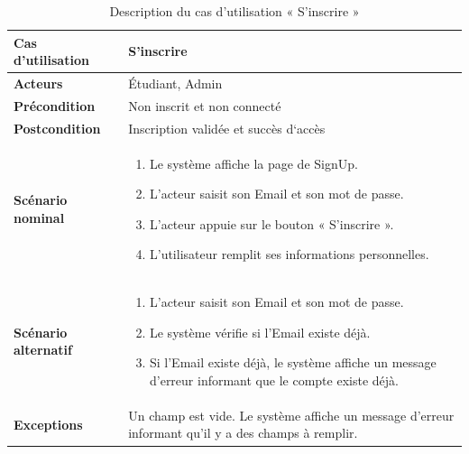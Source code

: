 \begin{sloppypar}
\begin{table}[h]
\centering
\begin{tabular}{|p{3cm}|p{12cm}|}
\hline
\textbf{Cas d'utilisation } & S’inscrire  \\
\hline
\textbf{Acteurs} & Étudiant, Admin \\
\hline
\textbf{Précondition} & Non inscrit et non connecté \\
\hline
\textbf{Postcondition} & Inscription validée et succès d‘accès \\
\hline
\textbf{Scénario nominal} & 
\begin{enumerate}
    \item Le système affiche la page de SignUp.
    \item L’acteur saisit son Email et son mot de passe.
    \item L’acteur appuie sur le bouton « S’inscrire ».
    \item L'utilisateur remplit ses informations personnelles.
\end{enumerate} \\
\hline
\textbf{Scénario alternatif} & 
\begin{enumerate}
    \item L’acteur saisit son Email et son mot de passe.
    \item Le système vérifie si l'Email existe déjà.
    \item Si l'Email existe déjà, le système affiche un message d’erreur informant que le compte existe déjà.
\end{enumerate} \\
\hline
\textbf{Exceptions} &  Un champ est vide. Le système affiche un message d’erreur informant qu'il y a des champs à remplir. \\
\hline
\end{tabular}
\caption{Description du cas d’utilisation « S'inscrire »}
\end{table}


\vspace{-9mm}

\end{sloppypar}
